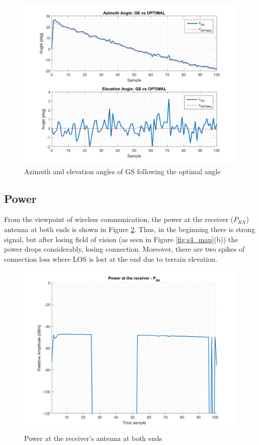 \begin{figure}[H]
	\centering
	\includegraphics[scale=0.8]{figures/s4_gs.png}
	\caption{Azimuth and elevation angles of GS following the optimal angle}
	\label{fig:s4_gs}
\end{figure}

\subsection{Power}
From the viewpoint of wireless communication, the power at the receiver ($P_{RX}$) antenna at both ends is shown in Figure \ref{fig:s4_power}. Thus, in the beginning there is strong signal, but after losing field of vision (as seen in Figure \ref{fig:s4_map}(b)) the power drops considerably, losing connection. Moreover, there are two spikes of connection loss where LOS is lost at the end due to terrain elevation.

\begin{figure}[H]
	\centering
	\includegraphics[scale=0.8]{figures/s4_power.png}
	\caption{Power at the receiver's antenna at both ends}
	\label{fig:s4_power}
\end{figure}